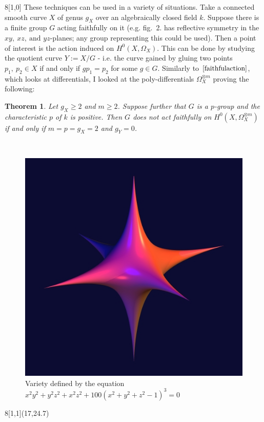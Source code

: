 \documentclass[a1,portrait]{a0poster}
\newtheorem{thm}{Theorem}
\begin{document}
\begin{textblock}{8}[1,0]
These techniques can be used in a variety of situations. Take a connected smooth curve $X$ of genus $g_X$ over an algebraically closed field $k$. Suppose there is a finite group $G$ acting faithfully on it (e.g. fig.\ 2. has reflective symmetry in the $xy,\ xz,\ \mbox{and } yz$-planes; any group representing this could be used). Then a point of interest is the action induced on $H^0(X,\Omega_X)$. This can be done by studying the quotient curve $Y:=X/G$ - i.e. the curve gained by gluing two points $p_1,\ p_2\in X$ if and only if $gp_1=p_2$ for some $g\in G$. Similarly to $\cite{faithfulaction}$, which looks at differentials, I looked at the poly-differentials $\Omega_X^{\otimes m}$ proving the following:
\begin{thm}
Let $g_X\geq 2$ and $m\geq 2$. Suppose further that $G$ is a $p$-group and the characteristic $p$ of $k$ is positive. Then $G$ does not act faithfully on $H^0(X,\Omega_X^{\otimes m})$ if and only if $m=p=g_X=2$ and $g_Y=0$.
\end{thm}
 ~

\begin{figure}
\centering
\includegraphics[scale=0.8]{./stern.jpeg}
\caption{Variety defined by the equation $x^2y^2 + y^2z^2 + x^2z^2 + 100 ( x^2 + y^2 + z^2 - 1)^
3 = 0$}
\label{fig:joe2}
\end{figure}

\end{textblock}


\begin{textblock}{8}[1,1](17,24.7)
    \small 
    




\end{textblock}






\end{document}
